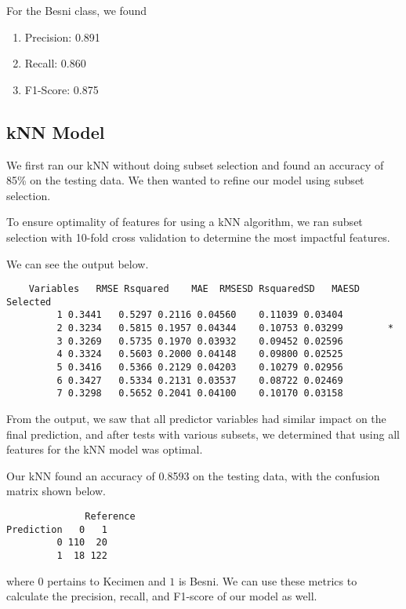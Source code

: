 \documentclass{article}
\begin{document}
For the Besni class, we found

\begin{enumerate}
    \item Precision: 0.891

    \item Recall: 0.860

    \item F1-Score: 0.875
\end{enumerate}

\newpage 

\subsection{kNN Model}
We first ran our kNN without doing subset selection and found an accuracy of 85\% on the testing data. We then wanted to refine our model using subset selection.

To ensure optimality of features for using a kNN algorithm, we ran subset selection with 10-fold cross validation to determine the most impactful features.

We can see the output below.

\begin{verbatim}
    Variables   RMSE Rsquared    MAE  RMSESD RsquaredSD   MAESD Selected
         1 0.3441   0.5297 0.2116 0.04560    0.11039 0.03404         
         2 0.3234   0.5815 0.1957 0.04344    0.10753 0.03299        *
         3 0.3269   0.5735 0.1970 0.03932    0.09452 0.02596         
         4 0.3324   0.5603 0.2000 0.04148    0.09800 0.02525         
         5 0.3416   0.5366 0.2129 0.04203    0.10279 0.02956         
         6 0.3427   0.5334 0.2131 0.03537    0.08722 0.02469         
         7 0.3298   0.5652 0.2041 0.04100    0.10170 0.03158 
\end{verbatim}

From the output, we saw that all predictor variables had similar impact on the final prediction, and after tests with various subsets, we determined that using all features for the kNN model was optimal.

Our kNN found an accuracy of 0.8593 on the testing data, with the confusion matrix shown below.

\begin{verbatim}
              Reference
Prediction   0   1
         0 110  20
         1  18 122
\end{verbatim}

where $0$ pertains to Kecimen and $1$ is Besni. We can use these metrics to calculate the precision, recall, and F1-score of our model as well.
\end{document}
